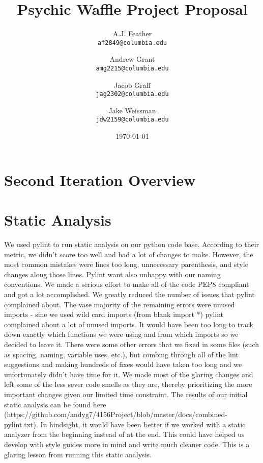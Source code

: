 \documentclass{article}
\title{Psychic Waffle Project Proposal}
\author{
    A.J. Feather\\
    \texttt{af2849@columbia.edu}
    \and
    Andrew Grant\\
    \texttt{amg2215@columbia.edu}
    \and
    Jacob Graff\\
    \texttt{jag2302@columbia.edu}
    \and
    Jake Weissman\\
    \texttt{jdw2159@columbia.edu}
}
\date{\today}
\begin{document}
\maketitle

\section{Second Iteration Overview}


\section{Static Analysis}
We used pylint to run static analysis on our python code base. According to their metric, we didn't score too well and had a lot of changes to make. However, the most common mistakes were lines too long, unnecessary parenthesis, and style changes along those lines. Pylint want also unhappy with our naming conventions. We made a serious effort to make all of the code PEP8 compliant and got a lot accomplished. We greatly reduced the number of issues that pylint complained about. The vase majority of the remaining errors were unused imports - sine we used wild card imports (from blank import *) pylint complained about a lot of unused imports. It would have been too long to track down exactly which functions we were using and from which imports so we decided to leave it. There were some other errors that we fixed in some files (such as spacing, naming, variable uses, etc.), but combing through all of the lint suggestions and making hundreds of fixes would have taken too long and we unfortunately didn't have time for it. We made most of the glaring changes and left some of the less sever code smells as they are, thereby prioritizing the more important changes given our limited time constraint. The results of our initial static analysis can be found here (https://github.com/andyg7/4156Project/blob/master/docs/combined-pylint.txt). In hindsight, it would have been better if we worked with a static analyzer from the beginning instead of at the end. This could have helped us develop with style guides more in mind and write much cleaner code. This is a glaring lesson from running this static analysis.
\end{document}
